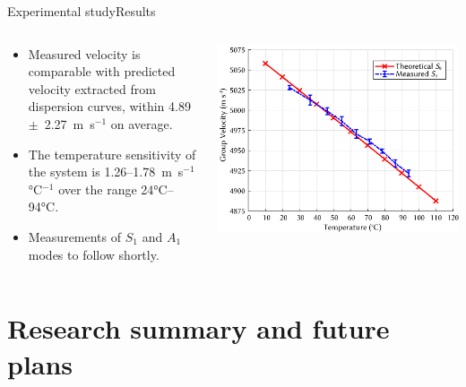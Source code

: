 \documentclass[aspectratio=169, 9pt]{beamer}
\begin{document}

\begin{frame}{Experimental study}{Results}

  \begin{columns}
    \begin{column}{0.5\textwidth}
      \begin{itemize}
        \item Measured velocity is comparable with predicted velocity extracted from dispersion curves, within 4.89~$\pm$~2.27~m~s$^{-1}$ on average. 
        \item The temperature sensitivity of the system is 1.26--1.78~m~s$^{-1}$\si{\degreeCelsius}$^{-1}$ over the range 24\si{\degreeCelsius}--94\si{\degreeCelsius}.
        \item Measurements of $S_1$ and $A_1$ modes to follow shortly. 
      \end{itemize}
    \end{column}
    \begin{column}{0.5\textwidth}  %
        \begin{center}
         \includegraphics[width=\textwidth]{images/aluplatemeasured.eps}
        \end{center}
    \end{column}
  \end{columns}
\end{frame}


\section{Research summary and future plans}
\end{document}
